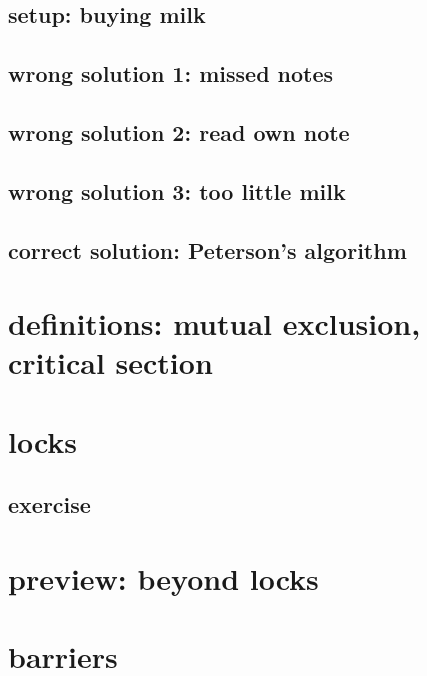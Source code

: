 \subsection{setup: buying milk}


\subsection{wrong solution 1: missed notes}


\subsection{wrong solution 2: read own note}


\subsection{wrong solution 3: too little milk}


\subsection{correct solution: Peterson's algorithm}


\section{definitions: mutual exclusion, critical section}



\section{locks}


\subsection{exercise}


\section{preview: beyond locks}


\section{barriers}


